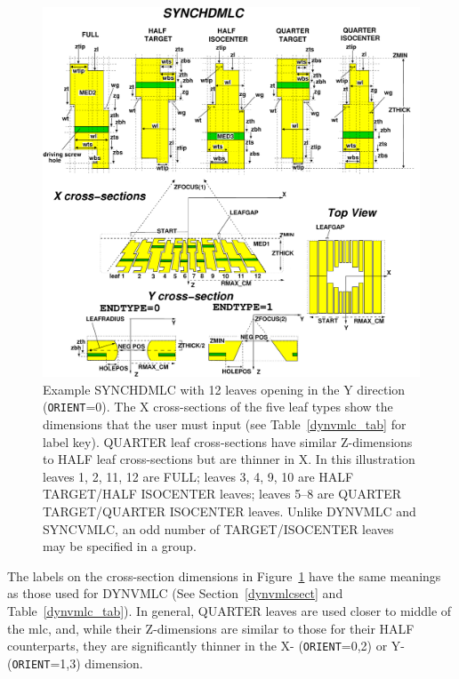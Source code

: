 \documentclass[12pt,twoside]{article}
\begin{document}
\begin{figure}[htpb]
\begin{center}
\begin{htmlonly}
\includegraphics[width=13cm]{figures/synchdmlcd}
\end{htmlonly}
\end{center}
\vspace*{-1.0cm}
\caption[SYNCHDMLC CM geometry]
{Example SYNCHDMLC with 12 leaves opening in the Y
direction ({\tt ORIENT}=0). The X cross-sections of the five
leaf types show the dimensions that the
user must input (see Table~\ref{dynvmlc_tab} for label key).
QUARTER leaf cross-sections have similar Z-dimensions
to HALF leaf cross-sections but are thinner in X.
In this illustration leaves 1, 2, 11, 12 are FULL; leaves 3, 4, 9, 10
are HALF TARGET/HALF ISOCENTER leaves; leaves 5--8 are QUARTER TARGET/QUARTER ISOCENTER
leaves.  Unlike DYNVMLC and SYNCVMLC, an odd number of TARGET/ISOCENTER leaves may be specified in a group.}
\label{synchdmlc_fig}
\end{figure}

The labels on the cross-section dimensions in Figure~\ref{synchdmlc_fig}
have the same meanings as those used for DYNVMLC (See Section~\ref{dynvmlcsect} and
Table~\ref{dynvmlc_tab}).  In general, QUARTER leaves
are used closer to middle of the mlc, and, while their Z-dimensions are similar to those for their HALF counterparts, they
are significantly thinner in the X- ({\tt ORIENT}=0,2) or Y- ({\tt ORIENT}=1,3)
dimension.
\end{document}
